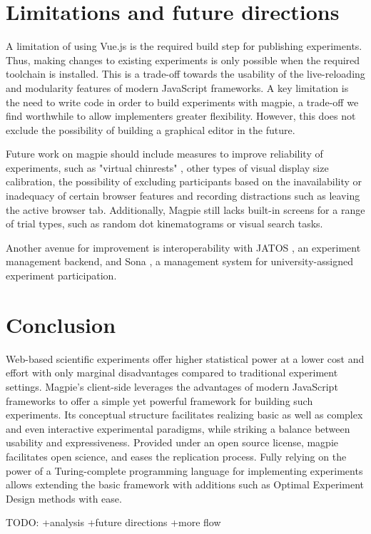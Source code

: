 \documentclass[a4paper,11pt]{scrreprt}
\begin{document}
\chapter{Limitations and future directions}
A limitation of using Vue.js is the required build step for publishing experiments. Thus, making changes to existing experiments is only possible when the required toolchain is installed. This is a trade-off towards the usability of the live-reloading and modularity features of modern JavaScript frameworks. A key limitation is the need to write code in order to build experiments with magpie, a trade-off we find worthwhile to allow implementers greater flexibility. However, this does not exclude the possibility of building a graphical editor in the future.

Future work on magpie should include measures to improve reliability of experiments, such as "virtual chinrests" \citep{Li2020}, other types of visual display size calibration, the possibility of excluding participants based on the inavailability or inadequacy of certain browser features and recording distractions such as leaving the active browser tab. Additionally, Magpie still lacks built-in screens for a range of trial types, such as random dot kinematograms or visual search tasks.

Another avenue for improvement is interoperability with JATOS \citep{Lange2015}, an experiment management backend, and Sona \citep{SonaSystems2002}, a management system for university-assigned experiment participation.

\chapter{Conclusion}
Web-based scientific experiments offer higher statistical power at a lower cost and effort with only marginal disadvantages compared to traditional experiment settings. Magpie's client-side leverages the advantages of modern JavaScript frameworks to offer a simple yet powerful framework for building such experiments. Its conceptual structure facilitates realizing basic as well as complex and even interactive experimental paradigms, while striking a balance between usability and expressiveness. Provided under an open source license, magpie facilitates open science, and eases the replication process. Fully relying on the power of a Turing-complete programming language for implementing experiments allows extending the basic framework with additions such as Optimal Experiment Design methods with ease.


TODO: +analysis +future directions +more flow

\newpage 
 

\end{document}
